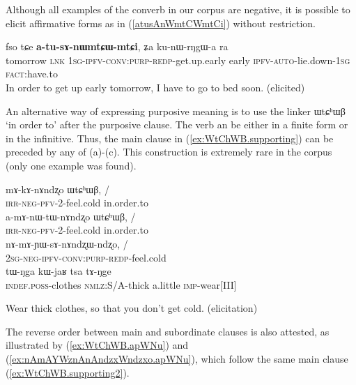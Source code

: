 \documentclass[oldfontcommands,oneside,a4paper,11pt]{article}
\newcommand{\ipa}[1]{{\phon \mbox{#1}}} %
\newcommand{\refb}[1]{(\ref{#1})}
\begin{document}
Although all examples of the converb in our corpus are negative, it is possible to elicit affirmative forms  as in \refb{atusAnWmtCWmtCi} without restriction.

\begin{exe}
\ex \label{atusAnWmtCWmtCi}
\gll
 \ipa{fso}   	\ipa{tɕe}   	\ipa{\textbf{a-tu-sɤ-nɯmtɕɯ-mtɕi},}   	\ipa{ʑa}   	\ipa{ku-nɯ-rŋgɯ-a}   	\ipa{ra}  \\
tomorrow \textsc{lnk} \textsc{1sg-ipfv-conv:purp-redp}-get.up.early early \textsc{ipfv-auto}-lie.down-\textsc{1sg} \textsc{fact}:have.to 
\\
\glt In order to get up early tomorrow, I have to go to bed soon. (elicited) 
\end{exe}

 An alternative way of expressing purposive meaning is to use the linker \ipa{ɯtɕʰɯβ} `in order to'  after the purposive clause. The verb  an be either in a finite form or in the infinitive.  Thus, the main clause in \refb{ex:WtChWB.supporting}  can be preceded by any of  (a)-(c).  This construction is extremely rare in the corpus (only one example was found).
 
 \begin{exe}
\ex \label{ex:WtChWB}  \begin{xlist}
\ex
 \gll 
\ipa{mɤ-kɤ-nɤndʐo} 	\ipa{ɯtɕʰɯβ,} 	/\\
 \textsc{irr-neg-pfv}-2-feel.cold in.order.to\\
 \ex
 \gll 
\ipa{a-mɤ-nɯ-tɯ-nɤndʐo} 	\ipa{ɯtɕʰɯβ,} / \\
 \textsc{irr-neg-pfv}-2-feel.cold in.order.to\\
 \ex \label{ex:nAmAsAnAndzxWndzxo}  
 \gll 
 \ipa{nɤ-mɤ-ɲɯ-sɤ-nɤndʐɯ-ndʐo,} /\\
 \textsc{2sg-neg-ipfv-conv:purp-redp}-feel.cold\\
 \ex  \label{ex:WtChWB.supporting}  
 \gll 
 \ipa{tɯ-ŋga}    	\ipa{kɯ-jaʁ}    	\ipa{tsa}    	\ipa{tɤ-ŋge}  \\
 \textsc{indef.poss}-clothes \textsc{nmlz}:S/A-thick a.little \textsc{imp}-wear[III] \\
  \end{xlist}
 \glt Wear thick clothes, so that you don't get cold. (elicitation)
  \end{exe}
 
The reverse order  between main and subordinate clauses is also attested,   as illustrated by \refb{ex:WtChWB.apWNu} and \refb{ex:nAmAYWznAnAndzxWndzxo.apWNu}, which follow the same   main clause \refb{ex:WtChWB.supporting2}.
\end{document}
